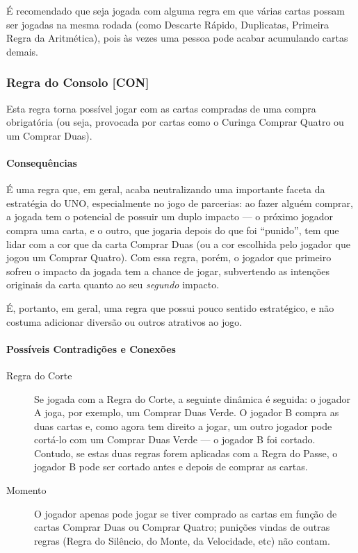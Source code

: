 É recomendado que seja jogada com alguma regra em que várias cartas possam ser jogadas na mesma rodada (como Descarte Rápido, Duplicatas, Primeira Regra da Aritmética), pois às vezes uma pessoa pode acabar acumulando cartas demais. 

\subsubsection{Regra do Consolo [CON]}

Esta regra torna possível jogar com as cartas compradas de uma compra obrigatória (ou seja, provocada por cartas como o Curinga Comprar Quatro ou um Comprar Duas).

\paragraph{Consequências}

É uma regra que, em geral, acaba neutralizando uma importante faceta da estratégia do UNO, especialmente no jogo de parcerias: ao fazer alguém comprar, a jogada tem o potencial de possuir um duplo impacto --- o próximo jogador compra uma carta, e o outro, que jogaria depois do que foi ``punido'', tem que lidar com a cor que da carta Comprar Duas (ou a cor escolhida pelo jogador que jogou um Comprar Quatro). Com essa regra, porém, o jogador que primeiro sofreu o impacto da jogada tem a chance de jogar, subvertendo as intenções originais da carta quanto ao seu \emph{segundo} impacto.

É, portanto, em geral, uma regra que possui pouco sentido estratégico, e não costuma adicionar diversão ou outros atrativos ao jogo.

\paragraph{Possíveis Contradições e Conexões}

\begin{description}
\item[Regra do Corte]{Se jogada com a Regra do Corte, a seguinte dinâmica é seguida: o jogador A joga, por exemplo, um Comprar Duas Verde. O jogador B compra as duas cartas e, como agora tem direito a jogar, um outro jogador pode cortá-lo com um Comprar Duas Verde --- o jogador B foi cortado. Contudo, se estas duas regras forem aplicadas com a Regra do Passe, o jogador B pode ser cortado antes e depois de comprar as cartas.}
\item[Momento]{O jogador apenas pode jogar se tiver comprado as cartas em função de cartas Comprar Duas ou Comprar Quatro; punições vindas de outras regras (Regra do Silêncio, do Monte, da Velocidade, etc) não contam.}
\end{description}

